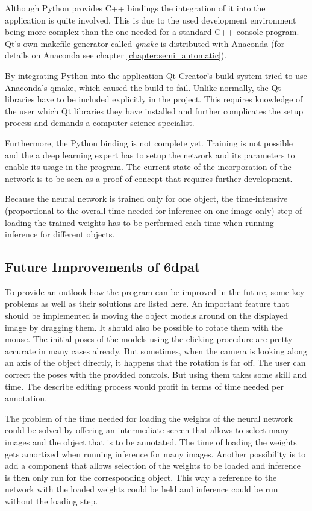 Although Python provides C++ bindings the integration of it into the application is quite involved. This is due to the used development environment being more complex than the one needed for a standard C++ console program. Qt's own makefile generator called \textit{qmake} is distributed with Anaconda (for details on Anaconda see chapter \ref{chapter:semi_automatic}). 

By integrating Python into the application Qt Creator's build system tried to use Anaconda's qmake, which caused the build to fail. Unlike normally, the Qt libraries have to be included explicitly in the project. This requires knowledge of the user which Qt libraries they have installed and further complicates the setup process and demands a computer science specialist. 

Furthermore, the Python binding is not complete yet. Training is not possible and the a deep learning expert has to setup the network and its parameters to enable its usage in the program. The current state of the incorporation of the network is to be seen as a proof of concept that requires further development.

Because the neural network is trained only for one object, the time-intensive (proportional to the overall time needed for inference on one image only) step of loading the trained weights has to be performed each time when running inference for different objects.

\subsection{Future Improvements of \gls{6dpat}}

To provide an outlook how the program can be improved in the future, some key problems as well as their solutions are listed here. An important feature that should be implemented is moving the object models around on the displayed image by dragging them. It should also be possible to rotate them with the mouse. The initial poses of the models using the clicking procedure are pretty accurate in many cases already. But sometimes, when the camera is looking along an axis of the object directly, it happens that the rotation is far off. The user can correct the poses with the provided controls. But using them takes some skill and time. The describe editing process would profit in terms of time needed per annotation. 

The problem of the time needed for loading the weights of the neural network could be solved by offering an intermediate screen that allows to select many images and the object that is to be annotated. The time of loading the weights gets amortized when running inference for many images. Another possibility is to add a component that allows selection of the weights to be loaded and inference is then only run for the corresponding object. This way a reference to the network with the loaded weights could be held and inference could be run without the loading step.

